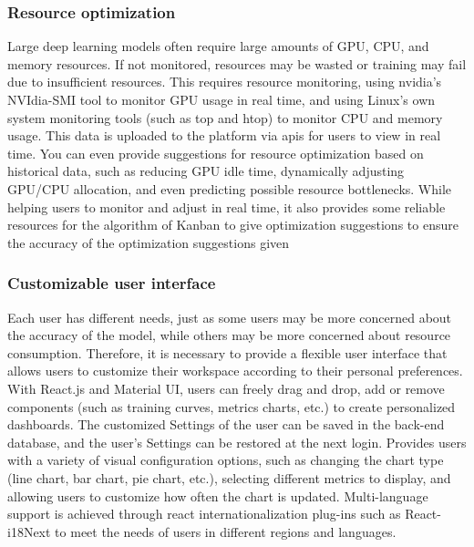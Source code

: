 \documentclass[12pt]{article}
\begin{document}
\subsubsection{Resource optimization}
Large deep learning models often require large amounts of GPU, CPU, and memory resources. If not monitored, resources may be wasted or training may fail due to insufficient resources. This requires resource monitoring, using nvidia's NVIdia-SMI tool to monitor GPU usage in real time, and using Linux's own system monitoring tools (such as top and htop) to monitor CPU and memory usage. This data is uploaded to the platform via apis for users to view in real time. You can even provide suggestions for resource optimization based on historical data, such as reducing GPU idle time, dynamically adjusting GPU/CPU allocation, and even predicting possible resource bottlenecks. While helping users to monitor and adjust in real time, it also provides some reliable resources for the algorithm of Kanban to give optimization suggestions to ensure the accuracy of the optimization suggestions given
\subsubsection{Customizable user interface}
Each user has different needs, just as some users may be more concerned about the accuracy of the model, while others may be more concerned about resource consumption. Therefore, it is necessary to provide a flexible user interface that allows users to customize their workspace according to their personal preferences. With React.js and Material UI, users can freely drag and drop, add or remove components (such as training curves, metrics charts, etc.) to create personalized dashboards. The customized Settings of the user can be saved in the back-end database, and the user's Settings can be restored at the next login. Provides users with a variety of visual configuration options, such as changing the chart type (line chart, bar chart, pie chart, etc.), selecting different metrics to display, and allowing users to customize how often the chart is updated. Multi-language support is achieved through react internationalization plug-ins such as React-i18Next to meet the needs of users in different regions and languages.
\end{document}
